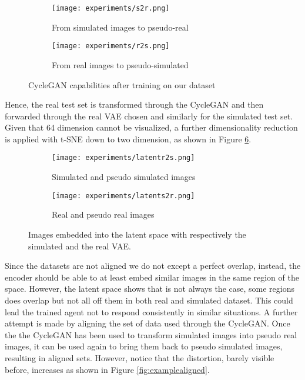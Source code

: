 \begin{figure}[h]
  \centering
  \begin{subfigure}{.6\linewidth}
      \centering
      \texttt{[image: experiments/s2r.png]}
      \caption{From simulated images to pseudo-real}\label{fig:s2r}
  \end{subfigure}
      \hfill
  \begin{subfigure}{.6\linewidth}
      \centering
      \texttt{[image: experiments/r2s.png]}
      \caption{From real images to pseudo-simulated}\label{fig:r2s}
  \end{subfigure}
  \caption{CycleGAN capabilities after training on our dataset}
  \label{fig:cycleganexample}
\end{figure}
Hence, the real test set is transformed through the CycleGAN and then forwarded through the real VAE chosen and similarly for the simulated test set. Given that 64 dimension cannot be visualized, a further dimensionality reduction is applied with t-SNE down to two dimension, as shown in Figure \ref{fig:latentpseudo}.
\begin{figure}[h]
  \centering
  \begin{subfigure}{.5\linewidth}
      \centering
      \texttt{[image: experiments/latentr2s.png]}
      \caption{Simulated and pseudo simulated images}\label{fig:latentr2s}
  \end{subfigure}%
      \hfill
  \begin{subfigure}{.5\linewidth}
      \centering
      \texttt{[image: experiments/latents2r.png]}
      \caption{Real and pseudo real images}\label{fig:latents2r}
  \end{subfigure}
  \caption{Images embedded into the latent space with respectively the simulated and the real VAE.}
  \label{fig:latentpseudo}
\end{figure}
Since the datasets are not aligned we do not except a perfect overlap, instead, the encoder should be able to at least embed similar images in the same region of the space. However, the latent space shows that is not always the case, some regions does overlap but not all off them in both real and simulated dataset. This could lead the trained agent not to respond consistently in similar situations. A further attempt is made by aligning the set of data used through the CycleGAN. Once the the CycleGAN has been used to transform simulated images into pseudo real images, it can be used again to bring them back to pseudo simulated images, resulting in aligned sets. However, notice that the distortion, barely visible before, increases as shown in Figure \ref{fig:examplealigned}.
